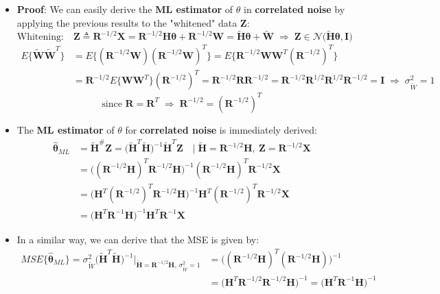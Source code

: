 \begin{itemize}
\item \textbf{Proof}: We can easily derive the \textbf{ML estimator} of \(\theta\) in \textbf{correlated noise} by applying the previous results to the "whitened" data \textbf{Z}:
\[
\text{Whitening:}\quad
\mathbf{Z} \triangleq \mathbf{R}^{-1/2}\mathbf{X}
= \mathbf{R}^{-1/2}\mathbf{H}\boldsymbol{\theta}
  + \mathbf{R}^{-1/2}\mathbf{W}
= \tilde{\mathbf{H}}\boldsymbol{\theta}
  + \tilde{\mathbf{W}}
\;\Rightarrow\;
\mathbf{Z} \in \mathcal{N}\big(\tilde{\mathbf{H}}\boldsymbol{\theta},\mathbf{I}\big)
\]
\begin{align*}
E\{\tilde{\mathbf{W}}\tilde{\mathbf{W}}^{T}\}
&= E\{(\mathbf{R}^{-1/2}\mathbf{W})(\mathbf{R}^{-1/2}\mathbf{W})^{T}\}
= E\{\mathbf{R}^{-1/2}\mathbf{W}\mathbf{W}^{T}(\mathbf{R}^{-1/2})^{T}\}\\[3pt]
&= \mathbf{R}^{-1/2}E\{\mathbf{W}\mathbf{W}^{T}\}(\mathbf{R}^{-1/2})^{T}
= \mathbf{R}^{-1/2}\mathbf{R}\mathbf{R}^{-1/2}
= \mathbf{R}^{-1/2}\mathbf{R}^{1/2}\mathbf{R}^{1/2}\mathbf{R}^{-1/2}
= \mathbf{I}
\;\Rightarrow\;
\sigma_{\tilde{W}}^{2} = 1
\end{align*}
\[
\text{since } \mathbf{R} = \mathbf{R}^{T}
\;\Rightarrow\;
\mathbf{R}^{-1/2} = (\mathbf{R}^{-1/2})^{T}
\]
\item The \textbf{ML estimator} of \(\theta\) for \textbf{correlated noise} is immediately derived:
\begin{align*}
\hat{\boldsymbol{\theta}}_{ML}
&= \tilde{\mathbf{H}}^{\#}\mathbf{Z}
 = \big(\tilde{\mathbf{H}}^{T}\tilde{\mathbf{H}}\big)^{-1}
   \tilde{\mathbf{H}}^{T}\mathbf{Z}
 \quad\big|\;
   \tilde{\mathbf{H}} = \mathbf{R}^{-1/2}\mathbf{H},
   \ \mathbf{Z} = \mathbf{R}^{-1/2}\mathbf{X} \\[4pt]
&= \big((\mathbf{R}^{-1/2}\mathbf{H})^{T}\mathbf{R}^{-1/2}\mathbf{H}\big)^{-1}
   (\mathbf{R}^{-1/2}\mathbf{H})^{T}\mathbf{R}^{-1/2}\mathbf{X} \\[4pt]
&= \big(\mathbf{H}^{T}(\mathbf{R}^{-1/2})^{T}\mathbf{R}^{-1/2}\mathbf{H}\big)^{-1}
   \mathbf{H}^{T}(\mathbf{R}^{-1/2})^{T}\mathbf{R}^{-1/2}\mathbf{X} \\[4pt]
&= \big(\mathbf{H}^{T}\mathbf{R}^{-1}\mathbf{H}\big)^{-1}
   \mathbf{H}^{T}\mathbf{R}^{-1}\mathbf{X}
\end{align*}
\item In a similar way, we can derive that the MSE is given by:
\begin{align*}
MSE\{\hat{\boldsymbol{\theta}}_{ML}\}= \sigma_{\tilde{W}}^{2}
   \big(\tilde{\mathbf{H}}^{T}\tilde{\mathbf{H}}\big)^{-1}
   \Big|_{\tilde{\mathbf{H}}=\mathbf{R}^{-1/2}\mathbf{H},
          \ \sigma_{\tilde{W}}^{2}=1} &= \big((\mathbf{R}^{-1/2}\mathbf{H})^{T}
        (\mathbf{R}^{-1/2}\mathbf{H})\big)^{-1} \\[4pt] &=\big(\mathbf{H}^{T}\mathbf{R}^{-1/2}\mathbf{R}^{-1/2}\mathbf{H}\big)^{-1} = \big(\mathbf{H}^{T}\mathbf{R}^{-1}\mathbf{H}\big)^{-1}
\end{align*}




\end{itemize}

